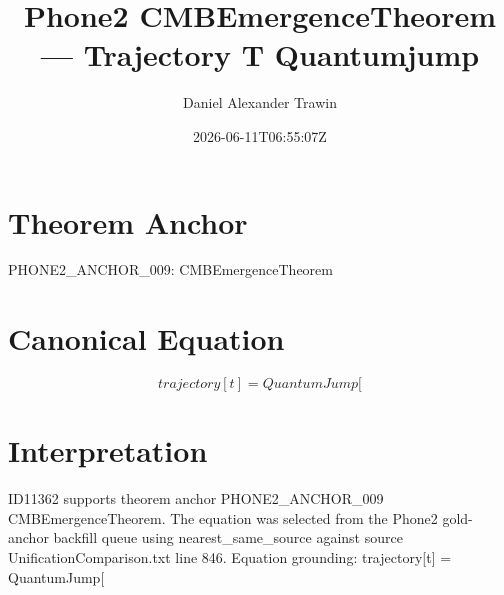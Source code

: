 \documentclass[11pt]{article}
\title{Phone2 CMBEmergenceTheorem — Trajectory T Quantumjump}
\author{Daniel Alexander Trawin}
\date{2026-06-11T06:55:07Z}
\begin{document}
\maketitle
\section*{Theorem Anchor}
PHONE2_ANCHOR_009: CMBEmergenceTheorem
\section*{Canonical Equation}
\[
trajectory[t] = QuantumJump[
\]
\section*{Interpretation}
ID11362 supports theorem anchor PHONE2_ANCHOR_009 CMBEmergenceTheorem. The equation was selected from the Phone2 gold-anchor backfill queue using nearest_same_source against source UnificationComparison.txt line 846. Equation grounding: trajectory[t] = QuantumJump[
\end{document}
